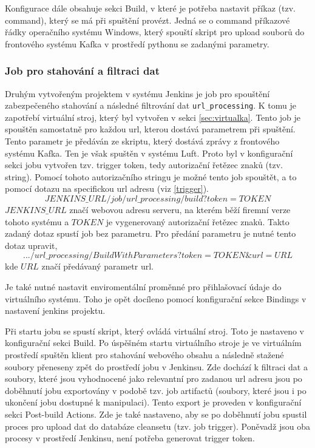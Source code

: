 \documentclass[thesis=M,czech,hidelinks]{FITthesis}[2013/05/06]
\begin{document}
Konfigurace dále obsahuje sekci Build, v které je potřeba nastavit příkaz (tzv. command), který se má při spuštění provézt. Jedná se o command příkazové řádky operačního systému Windows, který spouští skript pro upload souborů do frontového systému Kafka v prostředí pythonu se zadanými parametry.



\subsubsection{Job pro stahování a filtraci dat} \label{sec:jenkinsvirt}
Druhým vytvořeným projektem v systému Jenkins je job pro spouštění zabezpečeného stahování a následné filtrování dat \texttt{url_processing}. K tomu je zapotřebí virtuální stroj, který byl vytvořen v sekci \ref{sec:virtualka}. Tento job je spouštěn samostatně pro každou url, kterou dostává parametrem při spuštění. Tento parametr je předáván ze skriptu, který dostává zprávy z frontového systému Kafka. Ten je však spuštěn v systému Luft. Proto byl v konfigurační sekci jobu vytvořen tzv. trigger token, tedy autorizační řetězec znaků (tzv. string). Pomocí tohoto autorizačního stringu je možné tento job spouštět, a to pomocí dotazu na specifickou url adresu (viz \ref{trigger}).
\begin{equation} \label{trigger}
JENKINS\_URL/job/url\_processing/build?token=TOKEN
\end{equation}
$JENKINS\_URL$ značí webovou adresu serveru, na kterém běží firemní verze tohoto systému a $TOKEN$ je vygenerovaný autorizační řetězec znaků. Takto zadaný dotaz spustí job bez parametru. Pro předání parametru je nutné tento dotaz upravit,
\begin{equation}
.../url\_processing/BuildWithParameters?token=TOKEN\&url=URL
\end{equation}
kde $URL$ značí předávaný parametr url.

Je také nutné nastavit enviromentální proměnné pro přihlašovací údaje do virtuálního systému. Toho je opět docíleno pomocí konfigurační sekce Bindings v nastavení jenkins projektu. 

Při startu jobu se spustí skript, který ovládá virtuální stroj. Toto je nastaveno v konfigurační sekci Build. Po úspěšném startu virtuálního stroje je ve virtuálním prostředí spuštěn klient pro stahování webového obsahu a následně stažené soubory přeneseny zpět do prostředí jobu v Jenkinsu. Zde dochází k filtraci dat a soubory, které jsou vyhodnocené jako relevantní pro zadanou url adresu jsou po doběhnutí jobu exportovány v podobě tzv. job artifactů (soubory, které jsou i po ukončení jobu dostupné k manipulaci). Tento export je proveden v konfigurační sekci Post-build Actions. Zde je také nastaveno, aby se po doběhnutí jobu spustil proces pro upload dat do databáze cleansetu (tzv. job trigger). Poněvadž jsou oba procesy v prostředí Jenkinsu, není potřeba generovat trigger token.
\end{document}

